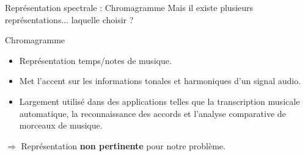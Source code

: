 \documentclass[compress,xcolor=table]{beamer}
\begin{document}
\begin{frame}{Représentation spectrale : Chromagramme}
    Mais il existe plusieurs représentations... laquelle choisir ?

    \begin{block}{Chromagramme}

        \begin{itemize}
            \item Représentation temps/notes de musique.
            \item Met l'accent sur les informations tonales et harmoniques d'un signal audio.
            \item Largement utilisé dans des applications telles que la transcription musicale automatique, la reconnaissance des accords et l'analyse comparative de morceaux de musique.
        \end{itemize}

    \end{block}

    $\Rightarrow$ Représentation \textbf{non pertinente} pour notre problème.

\end{frame}
\end{document}
